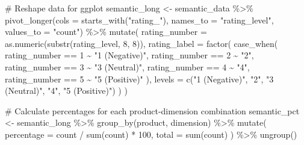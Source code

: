 \documentclass[
  letterpaper,
  DIV=11,
  numbers=noendperiod]{scrartcl}
\newenvironment{Shaded}{\begin{snugshade}}{\end{snugshade}}
\newcommand{\AttributeTok}[1]{\textcolor[rgb]{0.40,0.45,0.13}{#1}}
\newcommand{\CommentTok}[1]{\textcolor[rgb]{0.37,0.37,0.37}{#1}}
\newcommand{\DecValTok}[1]{\textcolor[rgb]{0.68,0.00,0.00}{#1}}
\newcommand{\FunctionTok}[1]{\textcolor[rgb]{0.28,0.35,0.67}{#1}}
\newcommand{\NormalTok}[1]{\textcolor[rgb]{0.00,0.23,0.31}{#1}}
\newcommand{\OtherTok}[1]{\textcolor[rgb]{0.00,0.23,0.31}{#1}}
\newcommand{\SpecialCharTok}[1]{\textcolor[rgb]{0.37,0.37,0.37}{#1}}
\newcommand{\StringTok}[1]{\textcolor[rgb]{0.13,0.47,0.30}{#1}}
\begin{document}
\begin{Shaded}
\begin{Highlighting}[]
\CommentTok{\# Reshape data for ggplot}
\NormalTok{semantic\_long }\OtherTok{\textless{}{-}}\NormalTok{ semantic\_data }\SpecialCharTok{\%\textgreater{}\%}
  \FunctionTok{pivot\_longer}\NormalTok{(}\AttributeTok{cols =} \FunctionTok{starts\_with}\NormalTok{(}\StringTok{"rating\_"}\NormalTok{),}
               \AttributeTok{names\_to =} \StringTok{"rating\_level"}\NormalTok{,}
               \AttributeTok{values\_to =} \StringTok{"count"}\NormalTok{) }\SpecialCharTok{\%\textgreater{}\%}
  \FunctionTok{mutate}\NormalTok{(}
    \AttributeTok{rating\_number =} \FunctionTok{as.numeric}\NormalTok{(}\FunctionTok{substr}\NormalTok{(rating\_level, }\DecValTok{8}\NormalTok{, }\DecValTok{8}\NormalTok{)),}
    \AttributeTok{rating\_label =} \FunctionTok{factor}\NormalTok{(}
      \FunctionTok{case\_when}\NormalTok{(}
\NormalTok{        rating\_number }\SpecialCharTok{==} \DecValTok{1} \SpecialCharTok{\textasciitilde{}} \StringTok{"1 (Negative)"}\NormalTok{,}
\NormalTok{        rating\_number }\SpecialCharTok{==} \DecValTok{2} \SpecialCharTok{\textasciitilde{}} \StringTok{"2"}\NormalTok{,}
\NormalTok{        rating\_number }\SpecialCharTok{==} \DecValTok{3} \SpecialCharTok{\textasciitilde{}} \StringTok{"3 (Neutral)"}\NormalTok{,}
\NormalTok{        rating\_number }\SpecialCharTok{==} \DecValTok{4} \SpecialCharTok{\textasciitilde{}} \StringTok{"4"}\NormalTok{,}
\NormalTok{        rating\_number }\SpecialCharTok{==} \DecValTok{5} \SpecialCharTok{\textasciitilde{}} \StringTok{"5 (Positive)"}
\NormalTok{      ),}
      \AttributeTok{levels =} \FunctionTok{c}\NormalTok{(}\StringTok{"1 (Negative)"}\NormalTok{, }\StringTok{"2"}\NormalTok{, }\StringTok{"3 (Neutral)"}\NormalTok{, }\StringTok{"4"}\NormalTok{, }\StringTok{"5 (Positive)"}\NormalTok{)}
\NormalTok{    )}
\NormalTok{  )}

\CommentTok{\# Calculate percentages for each product{-}dimension combination}
\NormalTok{semantic\_pct }\OtherTok{\textless{}{-}}\NormalTok{ semantic\_long }\SpecialCharTok{\%\textgreater{}\%}
  \FunctionTok{group\_by}\NormalTok{(product, dimension) }\SpecialCharTok{\%\textgreater{}\%}
  \FunctionTok{mutate}\NormalTok{(}
    \AttributeTok{percentage =}\NormalTok{ count }\SpecialCharTok{/} \FunctionTok{sum}\NormalTok{(count) }\SpecialCharTok{*} \DecValTok{100}\NormalTok{,}
    \AttributeTok{total =} \FunctionTok{sum}\NormalTok{(count)}
\NormalTok{  ) }\SpecialCharTok{\%\textgreater{}\%}
  \FunctionTok{ungroup}\NormalTok{()}


\end{Highlighting}
\end{Shaded}
\end{document}
